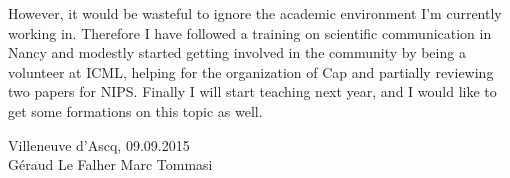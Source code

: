 However, it would be wasteful to ignore the academic environment I'm currently
working in. Therefore I have followed a training on scientific communication in
Nancy and modestly started getting involved in the community by being a
volunteer at ICML, helping for the organization of Cap and partially reviewing
two papers for NIPS. Finally I will start teaching next year, and I would like
to get some formations on this topic as well.

\vspace{6em}
\begin{center}
    Villeneuve d'Ascq, 09.09.2015 \\
    Géraud Le Falher \hspace{10em} Marc Tommasi
\end{center}

